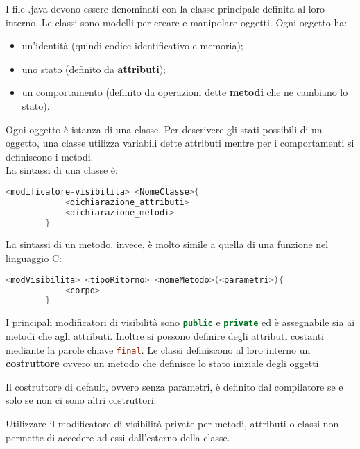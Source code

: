 \documentclass{subfiles}
\begin{document}
I file .java devono essere denominati con la classe principale definita al loro interno. Le classi sono modelli per creare
e manipolare oggetti. Ogni oggetto ha:
\begin{itemize}
    \item un'identità (quindi codice identificativo e memoria);
    \item uno stato (definito da \textbf{attributi});
    \item un comportamento (definito da operazioni dette \textbf{metodi} che ne cambiano lo stato).
\end{itemize}
Ogni oggetto è istanza di una classe. Per descrivere gli stati possibili di un oggetto, una classe utilizza variabili
dette  attributi mentre per i comportamenti si definiscono i metodi.\\
La sintassi di una classe è:
\begin{center}
    \begin{lstlisting}[style = general, language = java]
        <modificatore-visibilita> <NomeClasse>{
            <dichiarazione_attributi>
            <dichiarazione_metodi>
        }
    \end{lstlisting}
\end{center}
La sintassi di un metodo, invece, è molto simile a quella di una funzione nel linguaggio C:

\begin{center}
    \begin{lstlisting}[language = java, style = general]
        <modVisibilita> <tipoRitorno> <nomeMetodo>(<parametri>){
            <corpo>
        }
    \end{lstlisting}
\end{center}

\noindent I principali modificatori di visibilità sono \lstinline[language = java]{public} e \lstinline[language = java]{private} ed è
assegnabile sia ai metodi che agli attributi. Inoltre si possono definire degli attributi costanti mediante la parole chiave
\lstinline[language = java]{final}.
Le classi definiscono al loro interno un \textbf{costruttore} ovvero un metodo che definisce lo stato iniziale degli oggetti.

\noindent Il costruttore di default, ovvero senza parametri, è definito dal compilatore se e solo se non ci sono altri costruttori.

\begin{Note*}
    Utilizzare il modificatore di visibilità private per metodi, attributi o classi non permette di accedere ad essi
    dall'esterno della classe.
\end{Note*}
\end{document}
